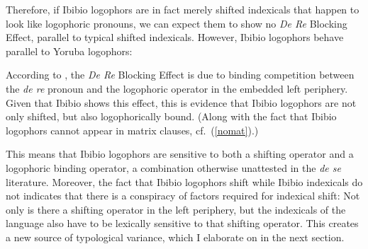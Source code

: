 \documentclass[output=paper]{langscibook}
\begin{document}
Therefore, if Ibibio logophors are in fact merely shifted indexicals that happen to look like logophoric pronouns, we can expect them to show no \textit{De Re} Blocking Effect, parallel to typical shifted indexicals. However, Ibibio logophors behave parallel to Yoruba logophors:
\begin{exe}
\end{exe}

According to \citet{Anand2006}, the \textit{De Re} Blocking Effect is due to binding competition between the \textit{de re} pronoun and the logophoric operator in the embedded left periphery. Given that Ibibio shows this effect, this is evidence that Ibibio logophors are not only shifted, but also logophorically bound. (Along with the fact that Ibibio logophors cannot appear in matrix clauses, cf.\ (\ref{nomat}).)

This means that Ibibio logophors are sensitive to both a shifting operator and a logophoric binding operator, a combination otherwise unattested in the \textit{de se} literature. Moreover, the fact that Ibibio logophors shift while Ibibio indexicals do not indicates that there is a conspiracy of factors required for indexical shift: Not only is there a shifting operator in the left periphery, but the indexicals of the language also have to be lexically sensitive to that shifting operator. This creates a new source of typological variance, which I elaborate on in the next section.
\end{document}
